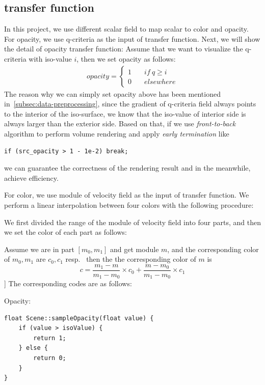 \documentclass[acmtog]{acmart}
\begin{document}
    \subsection{transfer function}\label{subsec:transfer-function}
    In this project, we use different scalar field to map scalar to color and opacity.
    For opacity, we use q-criteria as the input of transfer function.
    Next, we will show the detail of opacity transfer function:
    Assume that we want to visualize the q-criteria with iso-value $i$, then we set opacity as follows:
    \begin{align*}
        opacity = \left\{
        \begin{aligned}
            1&\quad if\ q \geq i\\
            0&\quad elsewhere
        \end{aligned}
        \right.
    \end{align*}
    The reason why we can simply set opacity above has been mentioned in~\ref{subsec:data-preprocessing}, since the gradient of q-criteria field always points to the interior of the iso-surface, we know that the iso-value of interior side is always larger than the exterior side.
    Based on that, if we use \emph{front-to-back} algorithm to perform volume rendering and apply \emph{early termination} like
    \begin{lstlisting}[label={lst:lstlisting}]
        if (src_opacity > 1 - 1e-2) break;
    \end{lstlisting}
    we can guarantee the correctness of the rendering result and in the meanwhile, achieve efficiency.

    For color, we use module of velocity field as the input of transfer function.
    We perform a linear interpolation between four colors with the following procedure:

    We first divided the range of the module of velocity field into four parts, and then we set the color of each part as follows:

    Assume we are in part $[m_0, m_1]$ and get module $m$, and the corresponding color of $m_0,m_1$ are $c_0, c_1$ resp.~ then the the corresponding color of $m$ is
    \[c=\frac{m_1-m}{m_1-m_0}\times c_0 + \frac{m-m_0}{m_1-m_0}\times c_1\]
    ]
    The corresponding codes are as follows:

    Opacity:
    \begin{lstlisting}[label={lst:lstlisting4}]
float Scene::sampleOpacity(float value) {
    if (value > isoValue) {
        return 1;
    } else {
        return 0;
    }
}
    \end{lstlisting}
\end{document}
